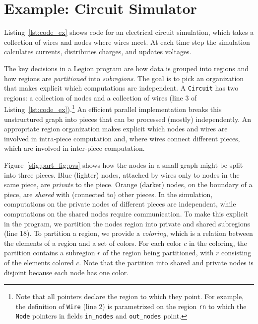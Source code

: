 \section{Example: Circuit Simulator}
\label{sec:ex}

Listing~\ref{lst:code_ex} shows code for an electrical
circuit simulation, which takes a collection of
wires and nodes where wires meet.  
At each time step the simulation calculates 
currents, distributes charges, and updates voltages.

The key decisions in a Legion program are how data is grouped into
regions and how  regions are {\em partitioned} into {\em
subregions}.  
%
%
The goal is to pick an organization that makes explicit
which computations are independent.  
A {\tt Circuit}
has two regions: a collection of nodes and a collection of wires (line
3 of Listing~\ref{lst:code_ex}).\footnote{Note that all pointers declare the region to which they point.  For
example, the definition of {\tt Wire} (line 2) is parametrized on the region
{\tt rn} to which the {\tt Node} pointers in fields {\tt in\_nodes}
and {\tt out\_nodes} point.}
An efficient parallel
implementation breaks this unstructured graph into pieces that can be
processed (mostly) independently. An appropriate
region organization makes explicit which nodes and wires are
involved in intra-piece computation and, where wires connect different pieces,
which are involved in inter-piece computation.

%
Figure~\ref{sfig:part_fig:pvs} shows how the nodes
in a small graph might be split into three pieces.  Blue (lighter) nodes,
attached by wires only to nodes in the same piece, are 
{\em private} to the piece.  Orange (darker) nodes, on the boundary of a
piece, are {\em shared} with (connected to) other pieces.
In the simulation, computations on the
private nodes of different pieces are independent, while
computations on the shared nodes require communication.  To make
this explicit in the program, we partition the nodes region into
private and shared subregions (line 18).  To partition a region, we
provide a {\em coloring}, which is a relation between the elements of
a region and a set of colors.  
For each color $c$ in the coloring, the partition contains a subregion $r$
of the region being partitioned, with $r$ consisting of the elements colored $c$.  Note that the
partition into shared and private nodes is disjoint because each node has one color.

